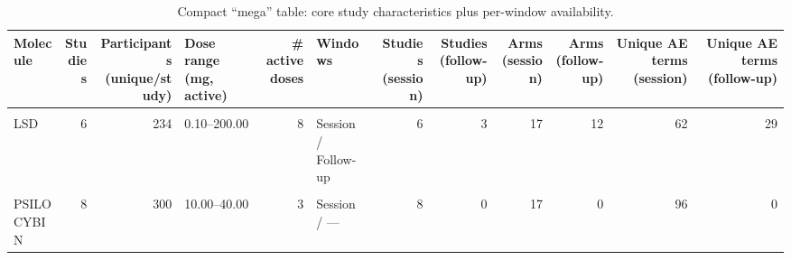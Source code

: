 \begin{table}[!h]
\centering
\caption{\label{tab:tab:mega_study_profile}Compact “mega” table: core study characteristics plus per-window availability.}
\centering
\begin{tabular}[t]{lrrlrlrrrrrr}
\toprule
Molecule & Studies & Participants (unique/study) & Dose range (mg, active) & \# active doses & Windows & Studies (session) & Studies (follow-up) & Arms (session) & Arms (follow-up) & Unique AE terms (session) & Unique AE terms (follow-up)\\
\midrule
\cellcolor{gray!10}{AYAHUASCA} & \cellcolor{gray!10}{2} & \cellcolor{gray!10}{24} & \cellcolor{gray!10}{0.36–0.36} & \cellcolor{gray!10}{1} & \cellcolor{gray!10}{Session / —} & \cellcolor{gray!10}{2} & \cellcolor{gray!10}{0} & \cellcolor{gray!10}{4} & \cellcolor{gray!10}{0} & \cellcolor{gray!10}{12} & \cellcolor{gray!10}{0}\\
LSD & 6 & 234 & 0.10–200.00 & 8 & Session / Follow-up & 6 & 3 & 17 & 12 & 62 & 29\\
\cellcolor{gray!10}{MDMA} & \cellcolor{gray!10}{10} & \cellcolor{gray!10}{215} & \cellcolor{gray!10}{75.00–150.00} & \cellcolor{gray!10}{5} & \cellcolor{gray!10}{Session / Follow-up} & \cellcolor{gray!10}{10} & \cellcolor{gray!10}{3} & \cellcolor{gray!10}{23} & \cellcolor{gray!10}{7} & \cellcolor{gray!10}{70} & \cellcolor{gray!10}{22}\\
PSILOCYBIN & 8 & 300 & 10.00–40.00 & 3 & Session / — & 8 & 0 & 17 & 0 & 96 & 0\\
\bottomrule
\end{tabular}
\end{table}
